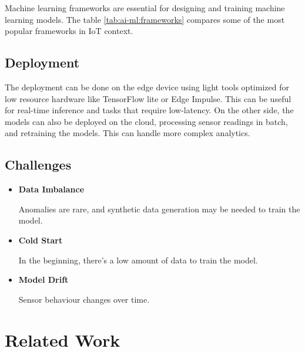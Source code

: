 Machine learning frameworks are essential for designing and training machine
learning models. The table \ref{tab:ai-ml:frameworks}
compares some of the most popular frameworks in \gls{IoT} context.

\subsection{Deployment}

The deployment can be done on the edge device using light tools optimized for
low resource hardware like TensorFlow lite or Edge Impulse. This can be useful
for real-time inference and tasks that require low-latency.
On the other side, the models can also be deployed on the cloud, processing
sensor readings in batch, and retraining the models. This can handle more
complex analytics.

\subsection{Challenges}

\begin{itemize}
	\item \textbf{Data Imbalance}

	      Anomalies are rare, and synthetic data generation may be needed to train
	      the model.
	\item \textbf{Cold Start}

	      In the beginning, there's a low amount of data to train the model.
	\item \textbf{Model Drift}

	      Sensor behaviour changes over time.
\end{itemize}

\section{Related Work}
